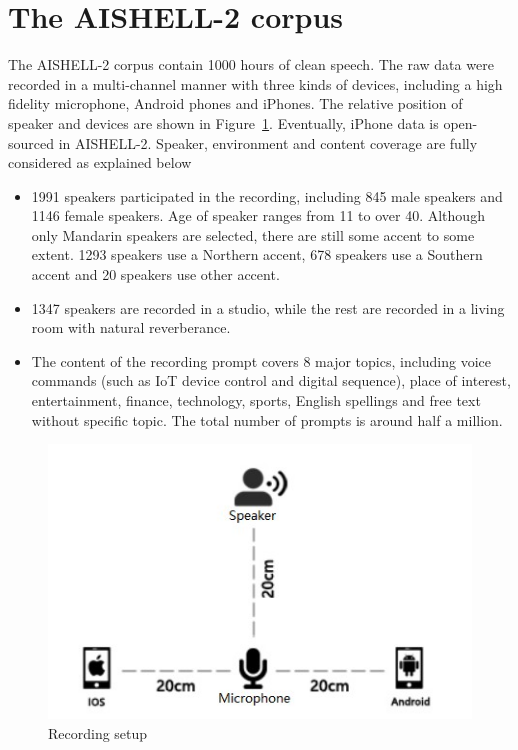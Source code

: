\documentclass[a4paper]{article}
\begin{document}
\section{The AISHELL-2 corpus}

The AISHELL-2 corpus contain 1000 hours of clean speech. The raw data were
recorded in a multi-channel manner with three kinds of devices, including a high
fidelity microphone, Android phones and iPhones. The relative position of
speaker and devices are shown in Figure~\ref{fig:setup}. Eventually, iPhone data
is open-sourced in AISHELL-2. Speaker, environment and content coverage are
fully considered as explained below
\begin{itemize}
\item 1991 speakers participated in the recording, including 845 male speakers
  and 1146 female speakers. Age of speaker ranges from 11 to over 40. Although
  only Mandarin speakers are selected, there are still some accent to some
  extent. 1293 speakers use a Northern accent, 678 speakers use a Southern
  accent and 20 speakers use other accent.
\item 1347 speakers are recorded in a studio, while the rest are recorded in a
  living room with natural reverberance.
\item The content of the recording prompt covers 8 major topics, including voice
  commands (such as IoT device control and digital sequence), place of interest,
  entertainment, finance, technology, sports, English spellings and free text
  without specific topic. The total number of prompts is around half a million.
\end{itemize}

\begin{figure}[t]
  \centering
  \includegraphics[width=\linewidth]{setup.jpg}
  \caption{Recording setup}
  \label{fig:setup}
\end{figure}
\end{document}
